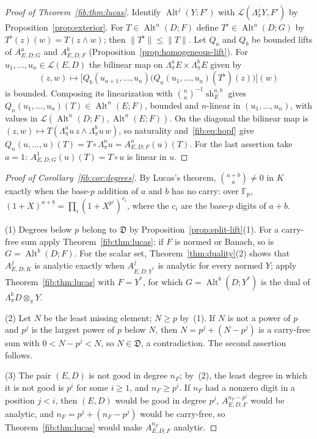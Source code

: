 \documentclass[11pt]{amsart}
\theoremstyle{definition}
\theoremstyle{remark}
\numberwithin{equation}{section}
\newcommand{\F}{\mathbb F}
\newcommand{\cL}{\mathcal L}
\newcommand{\Alt}{\operatorname{Alt}}
\newcommand{\norm}[1]{\lVert #1\rVert}
\theoremstyle{plain}
\theoremstyle{definition}
\theoremstyle{plain}
\newcommand{\fD}{\mathfrak D}
\begin{document}
\begin{proof}[Proof of Theorem~\ref{fib:thm:lucas}]
Identify $\Alt^j(Y;F')$ with $\cL(\Lambda^j_\pi Y,F')$ by Proposition~\ref{prop:exterior}. For $T\in\Alt^n(D;F)$
define $T^\flat\in\Alt^a(D;G)$ by $T^\flat(z)(w)=T(z\wedge w)$; then $\norm{T^\flat}\le\norm T$. Let $Q_a$ and $Q_b$ be
bounded lifts of $A^a_{E,D;G}$ and $A^b_{E,D;F}$ (Proposition~\ref{prop:homogeneous-lift}). For
$u_1,\dots,u_n\in\cL(E,D)$ the bilinear map on $\Lambda^a_\pi E\times\Lambda^b_\pi E$ given by
\[
 (z,w)\longmapsto\bigl[Q_b(u_{a+1},\dots,u_n)\bigl(Q_a(u_1,\dots,u_a)(T^\flat)(z)\bigr)\bigr](w)
\]
is bounded. Composing its linearization with
$\binom na^{-1}\operatorname{sh}^{a,b}_E$ gives $Q_n(u_1,\dots,u_n)(T)\in\Alt^n(E;F)$, bounded and $n$\nobreakdash-linear
in $(u_1,\dots,u_n)$, with values in $\cL(\Alt^n(D;F),\Alt^n(E;F))$. On the diagonal the bilinear map is
$(z,w)\mapsto T(\Lambda^a_\pi u\,z\wedge\Lambda^b_\pi u\,w)$, so naturality and~\eqref{fib:eq:hopf} give
$Q_n(u,\dots,u)(T)=T\circ\Lambda^n_\pi u=A^n_{E,D;F}(u)(T)$. For the last assertion take $a=1$:
$A^1_{E,D;G}(u)(T)=T\circ u$ is linear in $u$.
\end{proof}

\begin{proof}[Proof of Corollary~\ref{fib:cor:degrees}]
By Lucas's theorem, $\binom{a+b}a\ne0$ in $K$ exactly when the base-$p$ addition of $a$ and $b$ has no carry: over
$\F_p$, $(1+X)^{a+b}=\prod_i(1+X^{p^i})^{c_i}$, where the $c_i$ are the base-$p$ digits of $a+b$.

(1) Degrees below $p$ belong to $\fD$ by Proposition~\ref{prop:split-lift}(1). For a carry-free sum apply
Theorem~\ref{fib:thm:lucas}; if $F$ is normed or Banach, so is $G=\Alt^b(D;F)$. For the scalar set,
Theorem~\ref{thm:duality}(2) shows that $A^j_{E,D;K}$ is analytic exactly when $A^j_{E,D;Y^*}$ is analytic for every
normed $Y$; apply Theorem~\ref{fib:thm:lucas} with $F=Y^*$, for which $G=\Alt^b(D;Y^*)$ is the dual of
$\Lambda^b_\pi D\otimes_\pi Y$.

(2) Let $N$ be the least missing element; $N\ge p$ by~(1). If $N$ is not a power of $p$ and $p^j$ is the largest power
of $p$ below $N$, then $N=p^j+(N-p^j)$ is a carry-free sum with $0<N-p^j<N$, so $N\in\fD$, a contradiction. The second
assertion follows.

(3) The pair $(E,D)$ is not good in degree $n_F$; by~(2), the least degree in which it is not good is $p^i$ for some
$i\ge1$, and $n_F\ge p^i$. If $n_F$ had a nonzero digit in a position $j<i$, then $(E,D)$ would be good in degree $p^j$,
$A^{n_F-p^j}_{E,D;F}$ would be analytic, and $n_F=p^j+(n_F-p^j)$ would be carry-free, so
Theorem~\ref{fib:thm:lucas} would make $A^{n_F}_{E,D;F}$ analytic.
\end{proof}
\end{document}
